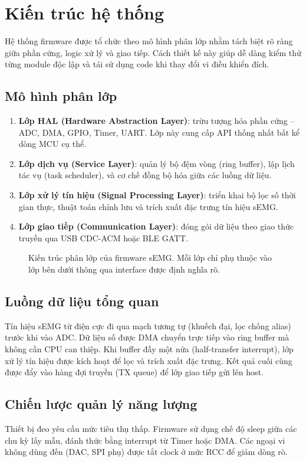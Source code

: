 \chapter{Kiến trúc hệ thống}
\label{ch:architecture}

Hệ thống firmware được tổ chức theo mô hình phân lớp nhằm tách biệt rõ ràng giữa phần cứng, logic xử lý và giao tiếp. Cách thiết kế này giúp dễ dàng kiểm thử từng module độc lập và tái sử dụng code khi thay đổi vi điều khiển đích.

\section{Mô hình phân lớp}

\begin{enumerate}
    \item \textbf{Lớp HAL (Hardware Abstraction Layer)}: trừu tượng hóa phần cứng -- ADC, DMA, GPIO, Timer, UART. Lớp này cung cấp API thống nhất bất kể dòng MCU cụ thể.
    \item \textbf{Lớp dịch vụ (Service Layer)}: quản lý bộ đệm vòng (ring buffer), lập lịch tác vụ (task scheduler), và cơ chế đồng bộ hóa giữa các luồng dữ liệu.
    \item \textbf{Lớp xử lý tín hiệu (Signal Processing Layer)}: triển khai bộ lọc số thời gian thực, thuật toán chỉnh lưu và trích xuất đặc trưng tín hiệu sEMG.
    \item \textbf{Lớp giao tiếp (Communication Layer)}: đóng gói dữ liệu theo giao thức truyền qua USB CDC-ACM hoặc BLE GATT.
\end{enumerate}

\begin{figure}[htbp]
    \centering
    \caption{Kiến trúc phân lớp của firmware sEMG. Mỗi lớp chỉ phụ thuộc vào lớp bên dưới thông qua interface được định nghĩa rõ.}
    \label{fig:architecture}
\end{figure}

\section{Luồng dữ liệu tổng quan}

Tín hiệu sEMG từ điện cực đi qua mạch tương tự (khuếch đại, lọc chống alias) trước khi vào ADC. Dữ liệu số được DMA chuyển trực tiếp vào ring buffer mà không cần CPU can thiệp. Khi buffer đầy một nửa (half-transfer interrupt), lớp xử lý tín hiệu được kích hoạt để lọc và trích xuất đặc trưng. Kết quả cuối cùng được đẩy vào hàng đợi truyền (TX queue) để lớp giao tiếp gửi lên host.

\section{Chiến lược quản lý năng lượng}

Thiết bị đeo yêu cầu mức tiêu thụ thấp. Firmware sử dụng chế độ sleep giữa các chu kỳ lấy mẫu, đánh thức bằng interrupt từ Timer hoặc DMA. Các ngoại vi không dùng đến (DAC, SPI phụ) được tắt clock ở mức RCC để giảm dòng rò.
